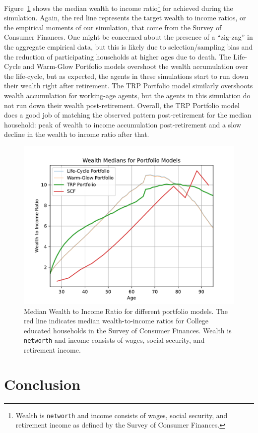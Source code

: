\documentclass{article}
\begin{document}
Figure~\ref{medwealth} shows the median wealth to income ratio\footnote{Wealth is \texttt{networth} and income consists of wages, social security, and retirement income as defined by the Survey of Consumer Finances.} for achieved during the simulation. Again, the red line represents the target wealth to income ratios, or the empirical moments of our simulation, that come from the Survey of Consumer Finances. One might be concerned about the presence of a ``zig-zag'' in the aggregate empirical data, but this is likely due to selection/sampling bias and the reduction of participating households at higher ages due to death. The Life-Cycle and Warm-Glow Portfolio models overshoot the wealth accumulation over the life-cycle, but as expected, the agents in these simulations start to run down their wealth right after retirement. The TRP Portfolio model similarly overshoots wealth accumulation for working-age agents, but the agents in this simulation do not run down their wealth post-retirement. Overall, the TRP Portfolio model does a good job of matching the observed pattern post-retirement for the median household: peak of wealth to income accumulation post-retirement and a slow decline in the wealth to income ratio after that.

\begin{figure}[!htbp]
\centering
\includegraphics[width=0.7\linewidth]{files/median_wealth-54ebc582b1bc7f823c4d514c0977f5a6.pdf}
\caption[]{Median Wealth to Income Ratio for different portfolio models. The red line indicates median wealth-to-income ratios for College educated households in the Survey of Consumer Finances. Wealth is \texttt{networth} and income consists of wages, social security, and retirement income.}
\label{medwealth}
\end{figure}

\section{Conclusion}
\end{document}

